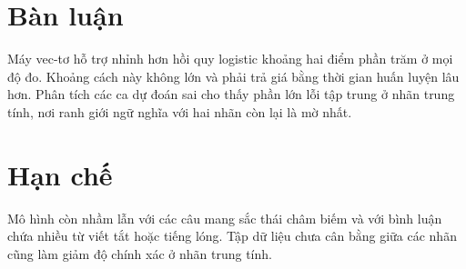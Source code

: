 \section{Bàn luận}

\begin{chuy}
\end{chuy}

\begin{mau}
Máy vec-tơ hỗ trợ nhỉnh hơn hồi quy logistic khoảng hai điểm phần trăm ở mọi
độ đo. Khoảng cách này không lớn và phải trả giá bằng thời gian huấn luyện
lâu hơn. Phân tích các ca dự đoán sai cho thấy phần lớn lỗi tập trung ở nhãn
trung tính, nơi ranh giới ngữ nghĩa với hai nhãn còn lại là mờ nhất.
\end{mau}

\section{Hạn chế}

\begin{chuy}
\end{chuy}

\begin{luuy}
Mô hình còn nhầm lẫn với các câu mang sắc thái châm biếm và với bình luận
chứa nhiều từ viết tắt hoặc tiếng lóng. Tập dữ liệu chưa cân bằng giữa các
nhãn cũng làm giảm độ chính xác ở nhãn trung tính.
\end{luuy}
